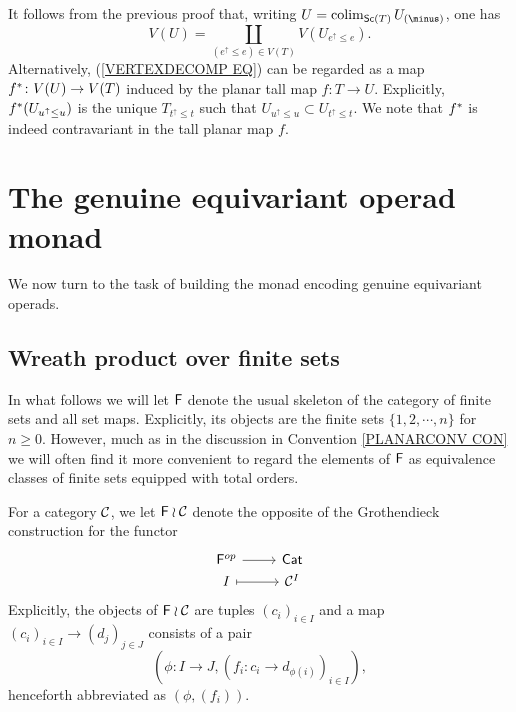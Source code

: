 \documentclass[a4paper,10pt]{article}%
\begin{document}
\begin{remark}\label{VERTEXDECOMP REM}
	It follows from the previous proof that, writing 
	$U = \colim_{\mathsf{Sc}(T)}U_{(\minus)}$,
	one has 
\begin{equation}\label{VERTEXDECOMP EQ}
	V(U) = \coprod_{(e^{\uparrow} \leq e) \in V(T)}
	V(U_{e^{\uparrow} \leq e}).
\end{equation}
Alternatively, (\ref{VERTEXDECOMP EQ}) can be regarded as a map 
$f^{\**} \colon V(U) \to V(T)$ induced by the planar tall map 
$f \colon T \to U$.
Explicitly, $f^{\**}(U_{u^{\uparrow} \leq u})$ 
is the unique $T_{t^{\uparrow}\leq t}$ such that
$U_{u^{\uparrow} \leq u} \subset U_{t^{\uparrow} \leq t}$. We note that $f^{\**}$ is indeed contravariant in the tall planar map $f$.
\end{remark}






\section{The genuine equivariant operad monad}

We now turn to the task of building the monad encoding genuine equivariant operads.



\subsection{Wreath product over finite sets}

In what follows we will let $\mathsf{F}$ denote the usual skeleton of the category of finite sets and all set maps. Explicitly, its objects are the finite sets $\{1,2,\cdots,n\}$ for $n\geq 0$.
However, much as in the discussion in 
Convention \ref{PLANARCONV CON} we will often find it more convenient to regard the elements of $\mathsf{F}$ as equivalence classes of finite sets equipped with total orders.
 

\begin{definition}
	For a category $\mathcal{C}$, we let $\mathsf{F} \wr \mathcal{C}$ denote the opposite of the Grothendieck construction for the functor
\[
\begin{tikzcd}[row sep=0pt]
	\Fin^{op} \ar{r} & \mathsf{Cat}
\\
	I \ar[r,mapsto] & \C^I
\end{tikzcd}	
 \]
Explicitly, the objects of $\mathsf{F} \wr \mathcal{C}$ are tuples $(c_i)_{i \in I}$ and a map 
$(c_i)_{i \in I} \to (d_j)_{j \in J}$ consists of a pair 
\[(\phi \colon I \to J, (f_i\colon c_i \to d_{\phi(i)})_{i\in I}),\]
 henceforth abbreviated as $(\phi,(f_i))$.
\end{definition}
 
\end{document}
